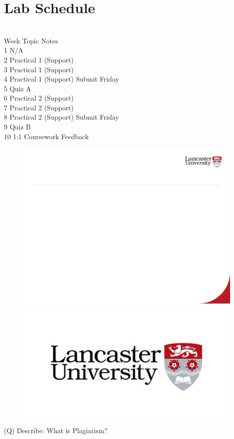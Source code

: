 \documentclass[12pt]{article}
\begin{document}
\section{Lab Schedule}
\\
Week Topic Notes\\
1 N/A\\
2 Practical 1 (Support)\\
3 Practical 1 (Support)\\
4 Practical 1 (Support) Submit Friday\\
5 Quiz A\\
6 Practical 2 (Support)\\
7 Practical 2 (Support)\\
8 Practical 2 (Support) Submit Friday\\
9 Quiz B\\
10 1:1 Coursework Feedback\\
\begin{figure}[H]
\includegraphics[width=0.5\linewidth]{page9-image-1.png}
\end{figure}
\begin{figure}[H]
\includegraphics[width=0.5\linewidth]{page9-image-2.png}
\end{figure}
\clearpage
(Q)
Describe: What is Plagiarism?
\clearpage
\end{document}
